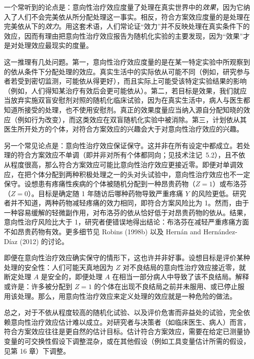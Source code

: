 \begin{finepoint}[关于意向性治疗效应的更多误解]
一个常听到的论点是：意向性治疗效应度量了处理在真实世界中的\emph{效果}，因为它纳入了人们不会完美依从所分配处理这一事实。相反，符合方案效应度量的是处理在完美依从下的\emph{效力}。用这套术语，人们常论证“效力”并不反映处理在真实条件下的效应，因而有理由把意向性治疗效应报告为随机化实验的主要发现，因为“效果”才是对处理效应最现实的度量。

这一推理有几处问题。第一，意向性治疗效应度量的是在某一特定实验中所观察到的依从条件下分配处理的效应。真实生活中的实际依从可能不同（例如，研究参与者若受到密切监测，可能依从得更好），而且实际上可能受该特定实验结果的影响（例如，人们得知某治疗有效后会更可能依从）。第二，若目标是效果，我们就应当放弃实施双盲安慰剂对照的随机化临床试验，因为在真实生活中，病人与医生都知道所接受的处理，也不使用安慰剂。真正的效果度量应当纳入源自分配知晓的效应（例如行为改变），而这类效应在双盲随机化实验中被消除。第三，计划依从其医生所开处方的个体，对符合方案效应的兴趣会大于对意向性治疗效应的兴趣。

另一个常见论点是：意向性治疗效应保证保守。这并非在所有设定中都成立。若处理的符合方案效应不单调（即并非对所有个体都同向；见技术注记~5.2），且不依从程度很高，那么符合方案效应可能比意向性治疗效应更接近零。即便对单调效应，在把个体分配到两种积极处理之一的头对头试验中，意向性治疗效应也不一定保守。设想患有疼痛性疾病的个体被随机分配到一种昂贵药物（$Z=1$）或布洛芬（$Z=0$）。目标是确定随 1 年随访后哪种药物导致严重疼痛 $Y$ 的风险更低。研究者并不知道，两种药物减轻疼痛的效力相同，即符合方案风险比为 1。然而，由于一种容易缓解的轻微副作用，对布洛芬的依从恰好低于对昂贵药物的依从。结果，意向性治疗风险比大于 1，研究者便错误地得出结论：布洛芬在减轻严重疼痛方面不如昂贵药物有效。更多细节见 Robins (1998b) 以及 Hernán and Hernández-Díaz (2012) 的讨论。
\end{finepoint}

即便在意向性治疗效应确实保守的情形下，这也许并非好事。设想目标是评价某种处理的安全性：人们可能天真地因为 $Z$ 对不良结局的意向性治疗效应接近零，就断定处理 $A$ 是安全的，即便处理 $A$ 在相当一部分病人中导致了该不良结局。解释或许是：许多被分配到 $Z=1$ 的个体在出现不良结局之前并未服用、或已停止服用该处理。那么，用意向性治疗效应来定义处理的效应就是一种危险的做法。

总之，对于不依从程度较高的随机化试验、以及评价危害而非益处的试验，完全依赖意向性治疗效应估计难以成立。对研究者与决策者（如临床医生、病人）而言，符合方案效应往往是更自然的估计目标。估计符合方案效应，需要在给定已测量协变量的可交换性假设下调整混杂，或在其他假设（例如工具变量估计所需的假设，见第 16 章）下调整。

